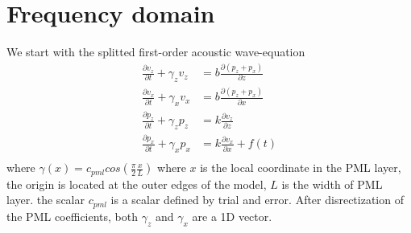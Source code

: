 \documentclass[revised,endfloat]{geophysics}
\begin{document}
\section{Frequency domain}
We start with the splitted first-order acoustic wave-equation 
\begin{equation}
\begin{split}
\frac{\partial v_z}{\partial t} + \gamma_z v_z &= b \frac{\partial (p_z+p_x)}{\partial z} \\
\frac{\partial v_x}{\partial t} + \gamma_x v_x &= b \frac{\partial (p_z+p_x)}{\partial x} \\
\frac{\partial p_z}{\partial t} + \gamma_z p_z &= k  \frac{\partial v_z}{\partial z} \\
\frac{\partial p_x}{\partial t} + \gamma_x p_x &= k  \frac{\partial v_x}{\partial x} + f(t) \\
\end{split}
\label{eq89}
\end{equation}
where $\gamma(x) = c_{pml} cos(\frac{\pi}{2} \frac{x}{L})$ where $x$ is the local coordinate in the PML layer, the origin is located at the outer edges of the model, $L$ is the width of PML layer. the scalar $c_{pml}$ is a scalar defined by trial and error. After disrectization of the PML coefficients, both $\gamma_z$ and $\gamma_x$ are a 1D vector.
\end{document}
